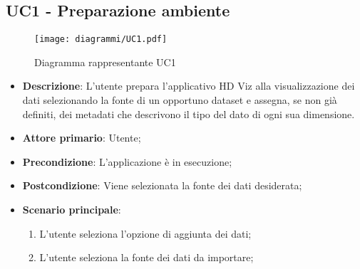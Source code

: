 \subsection{UC1 - Preparazione ambiente}
\label{sub:uc1}


\begin{figure}[h]
    \centering
    \texttt{[image: diagrammi/UC1.pdf]}
    \caption{Diagramma rappresentante UC1}
    \label{fig:UC1}
\end{figure}


\begin{itemize}
    \item \textbf{Descrizione}: L'utente prepara l'applicativo HD Viz alla visualizzazione dei dati selezionando la fonte di un opportuno dataset e assegna, se non già definiti, dei metadati che descrivono il tipo del dato di ogni sua dimensione.
	
    \item \textbf{Attore primario}: Utente;
        
    \item \textbf{Precondizione}:   L'applicazione è in esecuzione;

    \item \textbf{Postcondizione}:  Viene selezionata la fonte dei dati desiderata;

	\item \textbf{Scenario principale}:
		\begin{enumerate}
			\item L'utente seleziona l'opzione di aggiunta dei dati;
            \item L'utente seleziona la fonte dei dati da importare;
        \end{enumerate}
   
\end{itemize}


